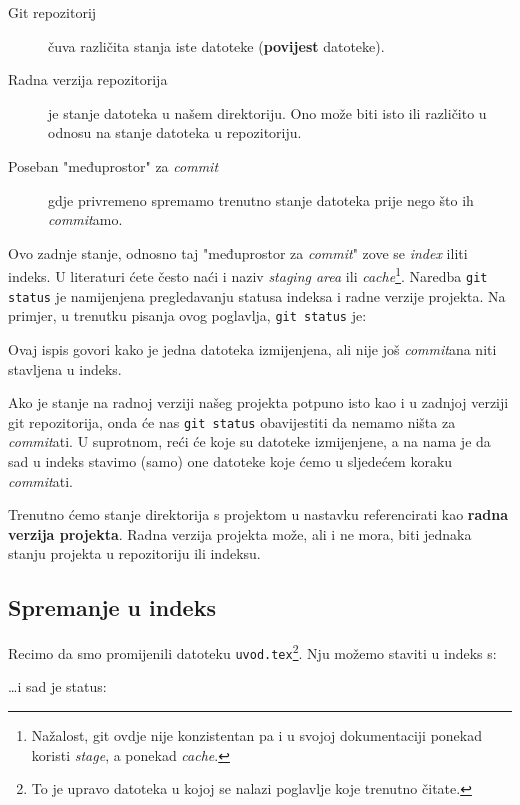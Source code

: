 \begin{description}
	\item[Git repozitorij] čuva različita stanja iste datoteke (\textbf{povijest} datoteke).
	\item[Radna verzija repozitorija] je stanje datoteka u našem direktoriju. Ono može biti isto ili različito u odnosu na stanje datoteka u repozitoriju.
	\item[Poseban "međuprostor" za \emph{commit}] gdje privremeno spremamo trenutno stanje datoteka prije nego što ih \emph{commit}amo.
\end{description}

Ovo zadnje stanje, odnosno taj "međuprostor za \emph{commit}" zove se \emph{index} iliti indeks.
U literaturi ćete često naći i naziv \emph{staging area} ili \emph{cache}\footnote{Nažalost, git ovdje nije konzistentan pa i u svojoj dokumentaciji ponekad koristi \emph{stage}, a ponekad \emph{cache}.}.
Naredba \verb+git status+ je namijenjena pregledavanju statusa indeksa i radne verzije projekta.
Na primjer, u trenutku pisanja ovog poglavlja, \verb+git status+ je:



Ovaj ispis govori kako je jedna datoteka izmijenjena, ali nije još \emph{commit}ana niti stavljena u indeks.

Ako je stanje na radnoj verziji našeg projekta potpuno isto kao i u zadnjoj verziji git repozitorija, onda će nas \verb+git status+ obavijestiti da nemamo ništa za \emph{commit}ati.
U suprotnom, reći će koje su datoteke izmijenjene, a na nama je da sad u indeks stavimo (samo) one datoteke koje ćemo u sljedećem koraku \emph{commit}ati.

Trenutno ćemo stanje direktorija s projektom u nastavku referencirati kao \textbf{radna verzija projekta}.
Radna verzija projekta može, ali i ne mora, biti jednaka stanju projekta u repozitoriju ili indeksu.

\subsection*{Spremanje u indeks}

Recimo da smo promijenili datoteku \verb+uvod.tex+\footnote{To je upravo datoteka u kojoj se nalazi poglavlje koje trenutno čitate.}.
Nju možemo staviti u indeks s:


\dots{}i sad je status:


